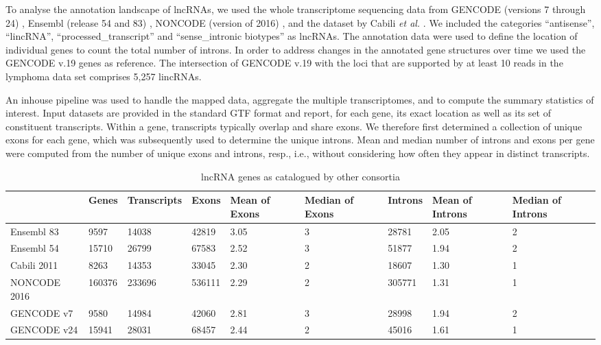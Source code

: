\documentclass[ncrna,article,submit,moreauthors,pdftex,10pt,a4paper]{mdpi}
\begin{document}
To analyse the annotation landscape of lncRNAs, we used the whole
transcriptome sequencing data from GENCODE (versions 7 through 24)
\cite{harrow2012}, Ensembl (release 54 and 83) \cite{flicek2014}, NONCODE
(version of 2016) \cite{zhao2016}, and the dataset by Cabili \textit{et
  al.}  \cite{cabili2011}. We included the categories ``antisense'',
``lincRNA'', ``processed\_transcript'' and ``sense\_intronic biotypes'' as
lncRNAs.  The annotation data were used to define the location of
individual genes to count the total number of introns. In order to address
changes in the annotated gene structures over time we used the GENCODE v.19
genes as reference. The intersection of GENCODE v.19 with the loci that are
supported by at least 10 reads in the lymphoma data set comprises 5,257
lincRNAs.

An inhouse pipeline was used to handle the mapped data, aggregate the
multiple transcriptomes, and to compute the summary statistics of
interest. Input datasets are provided in the standard GTF format and
report, for each gene, its exact location as well as its set of constituent
transcripts. Within a gene, transcripts typically overlap and share exons.
We therefore first determined a collection of unique exons for each gene,
which was subsequently used to determine the unique introns. Mean and median
number of introns and exons per gene were computed from the number of
unique exons and introns, resp., i.e., without considering how often they
appear in distinct transcripts. 

\begin{table}[ht]
\caption{lncRNA genes as catalogued by other consortia} 
\label{tab:consortia}
\begin{center}\tiny
\begin{tabular}[lrrrrrrrr]{p{}|p{}p{}p{}p{}
p{}p{}p{}p{}}
  \hline
 & Genes & Transcripts & Exons & Mean of Exons & Median of Exons & Introns & Mean of Introns & Median of Introns \\ 
   \hline
Ensembl 83 & 9597 & 14038 & 42819 & 3.05 &   3 & 28781 & 2.05 &   2 \\ 
  Ensembl 54 & 15710 & 26799 & 67583 & 2.52 &   3 & 51877 & 1.94 &   2 \\ 
  Cabili 2011 & 8263 & 14353 & 33045 & 2.30 &   2 & 18607 & 1.30 &   1 \\ 
  NONCODE 2016 & 160376 & 233696 & 536111 & 2.29 &   2 & 305771 & 1.31 &   1 \\ 
  GENCODE v7 & 9580 & 14984 & 42060 & 2.81 &   3 & 28998 & 1.94 &   2 \\ 
  GENCODE v24 & 15941 & 28031 & 68457 & 2.44 &   2 & 45016 & 1.61 &   1 \\ 
   \hline
\end{tabular}
\end{center}
\end{table}
\end{document}
